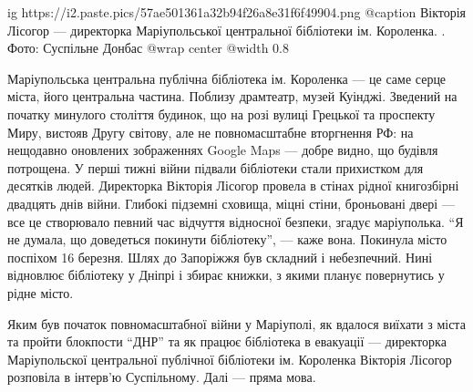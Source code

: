  
 
 
 
 

\ifcmt
	ig https://i2.paste.pics/57ae501361a32b94f26a8e31f6f49904.png
  @caption Вікторія Лісогор — директорка Маріупольської центральної бібліотеки ім. Короленка. . Фото: Суспільне Донбас
  @wrap center
  @width 0.8
\fi

\begin{qqquote}
Маріупольська центральна публічна бібліотека ім. Короленка — це саме серце
міста, його центральна частина. Поблизу драмтеатр, музей Куінджі. Зведений на
початку минулого століття будинок, що на розі вулиці Грецької та проспекту
Миру, вистояв Другу світову, але не повномасштабне вторгнення РФ: на нещодавно
оновлених зображеннях Google Maps — добре видно, що будівля потрощена. У перші
тижні війни підвали бібліотеки стали прихистком для десятків людей. Директорка
Вікторія Лісогор провела в стінах рідної книгозбірні двадцять днів війни.
Глибокі підземні сховища, міцні стіни, броньовані двері — все це створювало
певний час відчуття відносної безпеки, згадує маріуполька. \enquote{Я не думала, що
доведеться покинути бібліотеку}, — каже вона. Покинула місто поспіхом 16
березня. Шлях до Запоріжжя був складний і небезпечний. Нині відновлює
бібліотеку у Дніпрі і збирає книжки, з якими планує повернутись у рідне місто.

Яким був початок повномасштабної війни у Маріуполі, як вдалося виїхати з міста
та пройти блокпости \enquote{ДНР} та як працює бібліотека в евакуації — директорка
Маріупольскої центральної публічної бібліотеки ім. Короленка Вікторія Лісогор
розповіла в інтерв'ю Суспільному. Далі — пряма мова. 
	
\end{qqquote}
